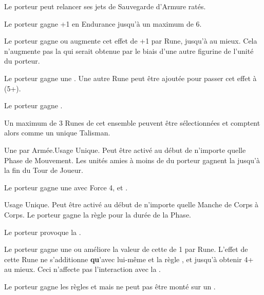 \begin{multicols}{2}
Le porteur peut relancer ses jets de Sauvegarde d'Armure ratés.

Le porteur gagne +1 en Endurance jusqu'à un maximum de 6.

Le porteur gagne  ou augmente cet effet de +1 par Rune, jusqu'à  au mieux. Cela n'augmente pas la \magicresistance{} qui serait obtenue par le biais d'une autre figurine de l'unité du porteur.

 Le porteur gagne une . Une autre Rune peut être ajoutée pour passer cet effet à (5+).

 Le porteur gagne .

\endpricelist

\columnbreak
\subtitle{Runes de Talisman}\vspace{5pt}

Un maximum de 3 Runes de cet ensemble peuvent être sélectionnées et comptent alors comme un unique Talisman.

\startpricelist

Une par Armée.\newline Usage Unique. Peut être activé au début de n'importe quelle Phase de Mouvement. Les unités amies à moins de  du porteur gagnent la \devastatingcharge{} jusqu'à la fin du Tour de Joueur.

Le porteur gagne une \breathweapon{} avec Force 4, \flamingattacks{} et \magicalattacks{}.

Usage Unique. Peut être activé au début de n'importe quelle Manche de Corps à Corps. Le porteur gagne la règle \stubborn{} pour la durée de la Phase.

Le porteur provoque la \fear{}.

Le porteur gagne une  ou améliore la valeur de cette \wardsave{} de 1 par Rune. L'effet de cette Rune ne s'additionne \textbf{qu}'avec lui-même et la règle \shieldwall{}, et jusqu'à obtenir 4+ au mieux. Ceci n'affecte pas l'interaction avec la \magicresistance{}.

Le porteur gagne les règles \vanguard{} et \scout{} mais ne peut pas être monté sur un \warthrone{}.


\end{multicols}
